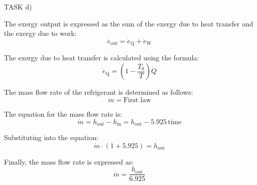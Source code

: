 TASK d)

The exergy output is expressed as the sum of the exergy due to heat transfer and the exergy due to work:
\[
\dot{e}_{\text{out}} = \dot{e}_{\text{Q}} + \dot{e}_{\text{W}}
\]

The exergy due to heat transfer is calculated using the formula:
\[
\dot{e}_{\text{Q}} = \left( 1 - \frac{T_0}{T} \right) \dot{Q}
\]

The mass flow rate of the refrigerant is determined as follows:
\[
\dot{m} = \text{First law}
\]

The equation for the mass flow rate is:
\[
\dot{m} = h_{\text{out}} - h_{\text{in}} = h_{\text{out}} - 5.925 \, \text{time}
\]

Substituting into the equation:
\[
\dot{m} \cdot (1 + 5.925) = h_{\text{out}}
\]

Finally, the mass flow rate is expressed as:
\[
\dot{m} = \frac{h_{\text{out}}}{6.925}
\]